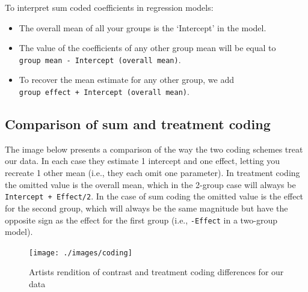 \documentclass[
]{book}
\newenvironment{Shaded}{\begin{snugshade}}{\end{snugshade}}
\newcommand{\CommentTok}[1]{\textcolor[rgb]{0.56,0.35,0.01}{\textit{#1}}}
\newcommand{\DocumentationTok}[1]{\textcolor[rgb]{0.56,0.35,0.01}{\textbf{\textit{#1}}}}
\newcommand{\FunctionTok}[1]{\textcolor[rgb]{0.00,0.00,0.00}{#1}}
\newcommand{\NormalTok}[1]{#1}
\newcommand{\OtherTok}[1]{\textcolor[rgb]{0.56,0.35,0.01}{#1}}
\newcommand{\SpecialCharTok}[1]{\textcolor[rgb]{0.00,0.00,0.00}{#1}}
\begin{document}
\begin{Shaded}
\end{Shaded}

To interpret sum coded coefficients in regression models:

\begin{itemize}
\item
  The overall mean of all your groups is the `Intercept' in the model.
\item
  The value of the coefficients of any other group mean will be equal to \texttt{group\ mean\ -\ Intercept\ (overall\ mean)}.
\item
  To recover the mean estimate for any other group, we add \texttt{group\ effect\ +\ Intercept\ (overall\ mean)}.
\end{itemize}

\hypertarget{comparison-of-sum-and-treatment-coding}{%
\subsection{Comparison of sum and treatment coding}\label{comparison-of-sum-and-treatment-coding}}

The image below presents a comparison of the way the two coding schemes treat our data. In each case they estimate 1 intercept and one effect, letting you recreate 1 other mean (i.e., they each omit one parameter). In treatment coding the omitted value is the overall mean, which in the 2-group case will always be \texttt{Intercept\ +\ Effect/2}. In the case of sum coding the omitted value is the effect for the second group, which will always be the same magnitude but have the opposite sign as the effect for the first group (i.e., \texttt{-Effect} in a two-group model).

\begin{figure}
\texttt{[image: ./images/coding]} \caption{Artists rendition of contrast and treatment coding differences for our data}\label{fig:contrast-figure}
\end{figure}
\end{document}
